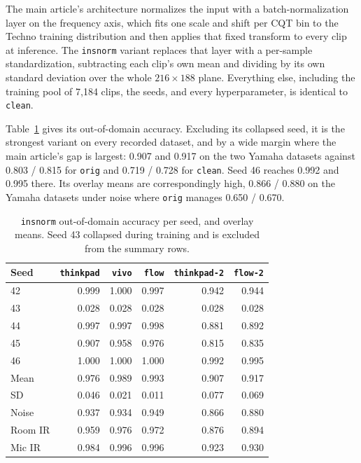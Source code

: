 \documentclass[pdflatex,sn-mathphys-num]{sn-jnl}
\begin{document}
The main article's architecture normalizes the input with a batch-normalization layer on the frequency axis, which fits one scale and shift per CQT bin to the Techno training distribution and then applies that fixed transform to every clip at inference. The \texttt{insnorm} variant replaces that layer with a per-sample standardization, subtracting each clip's own mean and dividing by its own standard deviation over the whole $216\times188$ plane. Everything else, including the training pool of 7{,}184 clips, the seeds, and every hyperparameter, is identical to \texttt{clean}.

Table~\ref{tab:esm-insnorm} gives its out-of-domain accuracy. Excluding its collapsed seed, it is the strongest variant on every recorded dataset, and by a wide margin where the main article's gap is largest: 0.907 and 0.917 on the two Yamaha datasets against 0.803 / 0.815 for \texttt{orig} and 0.719 / 0.728 for \texttt{clean}. Seed 46 reaches 0.992 and 0.995 there. Its overlay means are correspondingly high, 0.866 / 0.880 on the Yamaha datasets under noise where \texttt{orig} manages 0.650 / 0.670.

\begin{table}[t]
\caption{\texttt{insnorm} out-of-domain accuracy per seed, and overlay means. Seed 43 collapsed during training and is excluded from the summary rows.}\label{tab:esm-insnorm}
\setlength{\tabcolsep}{4pt}
\begin{tabular}{@{}lrrrrr@{}}
\toprule
Seed & \texttt{thinkpad} & \texttt{vivo} & \texttt{flow} & \texttt{thinkpad-2} & \texttt{flow-2} \\
\midrule
42 & 0.999 & 1.000 & 0.997 & 0.942 & 0.944 \\
43 & 0.028 & 0.028 & 0.028 & 0.028 & 0.028 \\
44 & 0.997 & 0.997 & 0.998 & 0.881 & 0.892 \\
45 & 0.907 & 0.958 & 0.976 & 0.815 & 0.835 \\
46 & 1.000 & 1.000 & 1.000 & 0.992 & 0.995 \\
\midrule
Mean & 0.976 & 0.989 & 0.993 & 0.907 & 0.917 \\
SD & 0.046 & 0.021 & 0.011 & 0.077 & 0.069 \\
\midrule
Noise & 0.937 & 0.934 & 0.949 & 0.866 & 0.880 \\
Room IR & 0.959 & 0.976 & 0.972 & 0.876 & 0.894 \\
Mic IR & 0.984 & 0.996 & 0.996 & 0.923 & 0.930 \\
\bottomrule
\end{tabular}
\end{table}
\end{document}
